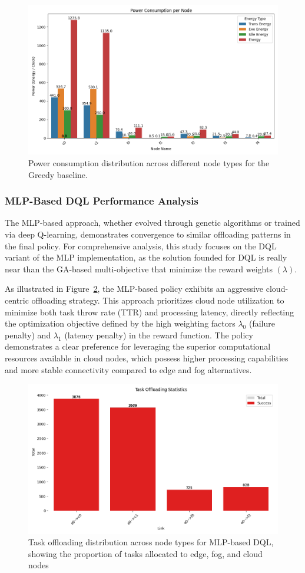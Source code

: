 \documentclass[preprint,3p,authoryear]{elsarticle}
\begin{document}
\begin{figure}[H]
    \centering
    \includegraphics[width=0.5\linewidth]{figs/Greedy/power_consumption_per_node.png}
    \caption{Power consumption distribution across different node types for the Greedy baseline.}
    \label{fig:greedy-power-consumption}
\end{figure}


\subsubsection{MLP-Based DQL Performance Analysis}\label{subsubsec:mlp-DQL-analysis}

The MLP-based approach, whether evolved through genetic algorithms or trained via deep Q-learning, demonstrates convergence to similar offloading patterns in the final policy. For comprehensive analysis, this study focuses on the DQL variant of the MLP implementation, as the solution founded for DQL is really near than the GA-based multi-objective that minimize the reward weights $(\lambda)$.

As illustrated in Figure~\ref{fig:mlp-task-offloading-stats}, the MLP-based policy exhibits an aggressive cloud-centric offloading strategy. This approach prioritizes cloud node utilization to minimize both task throw rate (TTR) and processing latency, directly reflecting the optimization objective defined by the high weighting factors $\lambda_0$ (failure penalty) and $\lambda_1$ (latency penalty) in the reward function. The policy demonstrates a clear preference for leveraging the superior computational resources available in cloud nodes, which possess higher processing capabilities and more stable connectivity compared to edge and fog alternatives.

\begin{figure}[H]
    \centering
    \includegraphics[width=0.5\linewidth]{figs/MLP/task_offloading_statistics.png}
    \caption{Task offloading distribution across node types for MLP-based DQL, showing the proportion of tasks allocated to edge, fog, and cloud nodes}
    \label{fig:mlp-task-offloading-stats}
\end{figure}
\end{document}

